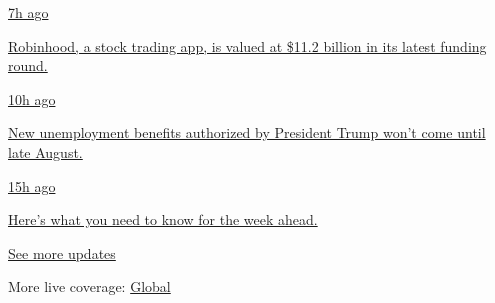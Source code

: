 \href{https://www.nytimes3xbfgragh.onion/live/2020/08/17/business/stock-market-today-coronavirus?action=click\&pgtype=Article\&state=default\&region=MAIN_CONTENT_1\&context=storylines_live_updates\#robinhood-a-stock-trading-app-is-valued-at-11-2-billion-in-its-latest-funding-round}{7h
ago}

\href{https://www.nytimes3xbfgragh.onion/live/2020/08/17/business/stock-market-today-coronavirus?action=click\&pgtype=Article\&state=default\&region=MAIN_CONTENT_1\&context=storylines_live_updates\#robinhood-a-stock-trading-app-is-valued-at-11-2-billion-in-its-latest-funding-round}{Robinhood,
a stock trading app, is valued at \$11.2 billion in its latest funding
round.}

\href{https://www.nytimes3xbfgragh.onion/live/2020/08/17/business/stock-market-today-coronavirus?action=click\&pgtype=Article\&state=default\&region=MAIN_CONTENT_1\&context=storylines_live_updates\#new-unemployment-benefits-authorized-by-president-trump-wont-come-until-late-august}{10h
ago}

\href{https://www.nytimes3xbfgragh.onion/live/2020/08/17/business/stock-market-today-coronavirus?action=click\&pgtype=Article\&state=default\&region=MAIN_CONTENT_1\&context=storylines_live_updates\#new-unemployment-benefits-authorized-by-president-trump-wont-come-until-late-august}{New
unemployment benefits authorized by President Trump won't come until
late August.}

\href{https://www.nytimes3xbfgragh.onion/live/2020/08/17/business/stock-market-today-coronavirus?action=click\&pgtype=Article\&state=default\&region=MAIN_CONTENT_1\&context=storylines_live_updates\#heres-what-you-need-to-know-for-the-week-ahead}{15h
ago}

\href{https://www.nytimes3xbfgragh.onion/live/2020/08/17/business/stock-market-today-coronavirus?action=click\&pgtype=Article\&state=default\&region=MAIN_CONTENT_1\&context=storylines_live_updates\#heres-what-you-need-to-know-for-the-week-ahead}{Here's
what you need to know for the week ahead.}

\href{https://www.nytimes3xbfgragh.onion/live/2020/08/17/business/stock-market-today-coronavirus?action=click\&pgtype=Article\&state=default\&region=MAIN_CONTENT_1\&context=storylines_live_updates}{See
more updates}

More live coverage:
\href{https://www.nytimes3xbfgragh.onion/2020/08/17/world/coronavirus-covid.html?action=click\&pgtype=Article\&state=default\&region=MAIN_CONTENT_1\&context=storylines_live_updates}{Global}


